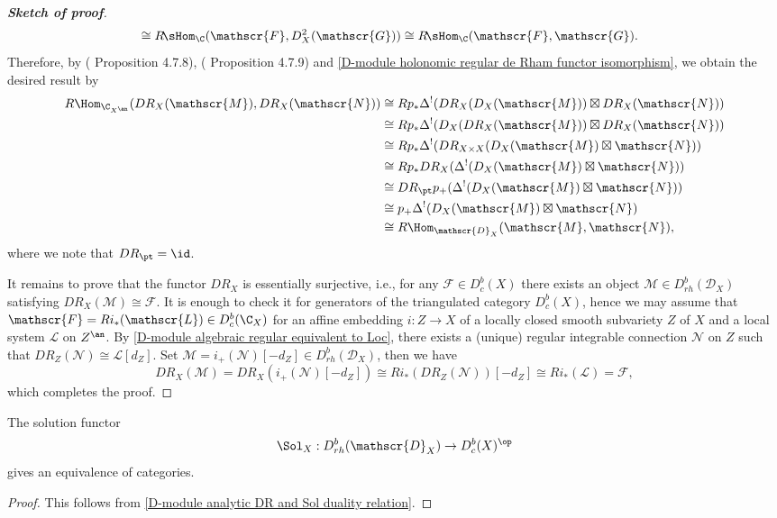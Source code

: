 \begin{proof}[\textbf{Sketch of proof}]
\begin{align*}
&\cong R\!\sHom_{\C}(\mathscr{F},D_X^2(\mathscr{G}))\cong R\!\sHom_{\C}(\mathscr{F},\mathscr{G}).
\end{align*}
Therefore, by (\cite{Hotta} Proposition 4.7.8), (\cite{Hotta} Proposition 4.7.9) and \cref{D-module holonomic regular de Rham functor isomorphism}, we obtain the desired result by
\begin{align*}
R\Hom_{\C_{X^{\an}}}(DR_X(\mathscr{M}),DR_X(\mathscr{N}))&\cong Rp_*\Delta^!(DR_X(D_X(\mathscr{M}))\boxtimes DR_X(\mathscr{N}))\\
&\cong Rp_*\Delta^!(D_X(DR_X(\mathscr{M}))\boxtimes DR_X(\mathscr{N}))\\
&\cong Rp_*\Delta^!(DR_{X\times X}(D_X(\mathscr{M})\boxtimes \mathscr{N}))\\
&\cong Rp_*DR_X(\Delta^!(D_X(\mathscr{M})\boxtimes\mathscr{N}))\\
&\cong DR_{\pt}p_+(\Delta^!(D_X(\mathscr{M})\boxtimes\mathscr{N}))\\
&\cong p_+\Delta^!(D_X(\mathscr{M})\boxtimes\mathscr{N})\\
&\cong R\Hom_{\mathscr{D}_X}(\mathscr{M},\mathscr{N}),
\end{align*}
where we note that $DR_{\pt}=\id$.\par
It remains to prove that the functor $DR_X$ is essentially surjective, i.e., for any $\mathscr{F}\in D^b_c(X)$ there exists an object $\mathscr{M}\in D^b_{rh}(\mathscr{D}_X)$ satisfying $DR_X(\mathscr{M})\cong\mathscr{F}$. It is enough to check it for generators of the triangulated category $D^b_c(X)$, hence we may assume that $\mathscr{F}=Ri_*(\mathscr{L})\in D^b_c(\C_X)$ for an affine embedding $i:Z\to X$ of a locally closed smooth subvariety $Z$ of $X$ and a local system $\mathscr{L}$ on $Z^{\an}$. By \cref{D-module algebraic regular equivalent to Loc}, there exists a (unique) regular integrable connection $\mathscr{N}$ on $Z$ such that $DR_Z(\mathscr{N})\cong\mathscr{L}[d_Z]$. Set $\mathscr{M}=i_+(\mathscr{N})[-d_Z]\in D^b_{rh}(\mathscr{D}_X)$, then we have
\[DR_X(\mathscr{M})=DR_X(i_+(\mathscr{N})[-d_Z])\cong Ri_*(DR_Z(\mathscr{N}))[-d_Z]\cong Ri_*(\mathscr{L})=\mathscr{F},\]
which completes the proof.
\end{proof}

\begin{corollary}
The solution functor
\[\Sol_X:D^b_{rh}(\mathscr{D}_X)\to D^b_c(X)^{\op}\]
gives an equivalence of categories.
\end{corollary}
\begin{proof}
This follows from \cref{D-module analytic DR and Sol duality relation}.
\end{proof}

